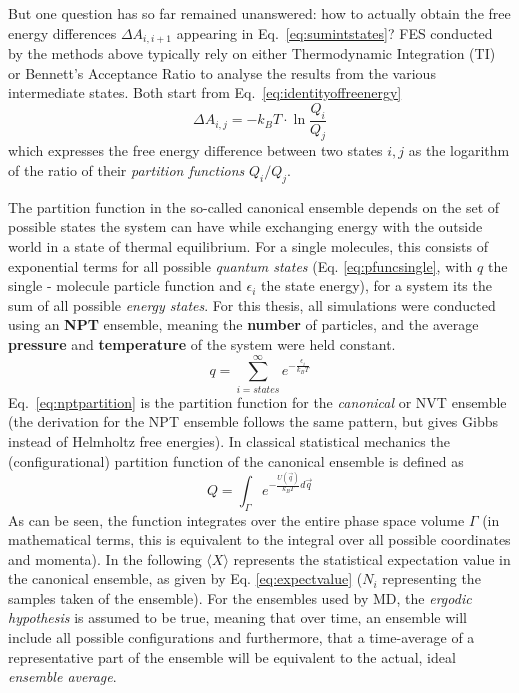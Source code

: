 \documentclass[oneside]{scrreprt}
\begin{document}
But one question has so far remained unanswered: how to actually obtain the free energy differences $\Delta A_{i,i+1}$ appearing in Eq.~\ref{eq:sumintstates}? 
FES conducted by the methods above typically rely on either Thermodynamic Integration (TI) \cite{straatsma_free_1986} or Bennett's Acceptance Ratio \cite{Bennett1976Oct,shirts_statistically_2008} to analyse the results from the various intermediate states. Both start from Eq.~\ref{eq:identityoffreenergy}
\begin{equation} \label{eq:identityoffreenergy}
    \Delta A_{i,j}=-k_{B}T\cdot \ln\frac{Q_i}{Q_j}
\end{equation}
which expresses the free energy difference between two states $i,j$ as the logarithm of the ratio of their \emph{partition functions} $Q_{i}/Q_j$.

The partition function in the so-called canonical ensemble depends on the set of possible states the system can have while exchanging energy with the outside world in a state of thermal equilibrium. For a single molecules, this consists of exponential terms for all possible \textit{quantum states} (Eq. \ref{eq:pfuncsingle}, with $q$ the single - molecule particle function and $\epsilon_i$ the state energy), for a system its the sum of all possible \textit{energy states}\cite{jensen_introduction_2017}. For this thesis, all simulations were conducted using an \textbf{NPT} ensemble, meaning the \textbf{number} of particles, and the average \textbf{pressure} and \textbf{temperature} of the system were held constant.
\begin{equation}\label{eq:pfuncsingle}
    q=\sum_{i=states}^\infty e^{-\frac{\epsilon_i}{k_BT}}
\end{equation}
Eq.~\ref{eq:nptpartition} is the partition function for the  \emph{canonical} or NVT ensemble (the derivation for the NPT ensemble follows the same pattern, but gives Gibbs instead of Helmholtz free energies). In classical statistical mechanics the (configurational) partition function of the canonical ensemble is defined as
\begin{equation} \label{eq:nptpartition}
    Q=\int_\Gamma e^{-\frac{U(\Vec{q})}{k_B T}d\Vec{q}}
\end{equation}
As can be seen, the function integrates over the entire phase space volume $\Gamma$ (in mathematical terms, this is equivalent to the integral over all possible coordinates and momenta). In the following $\langle X \rangle$ represents the statistical expectation value in the canonical ensemble, as given by Eq. \ref{eq:expectvalue} ($N_i$ representing the samples taken of the ensemble). For the ensembles used by MD, the \textit{ergodic hypothesis} is assumed to be true, meaning that over time, an ensemble will include all possible configurations and furthermore, that a time-average of a representative part of the ensemble will be equivalent to the actual, ideal \textit{ensemble average}\cite{jensen_introduction_2017}.
\end{document}
